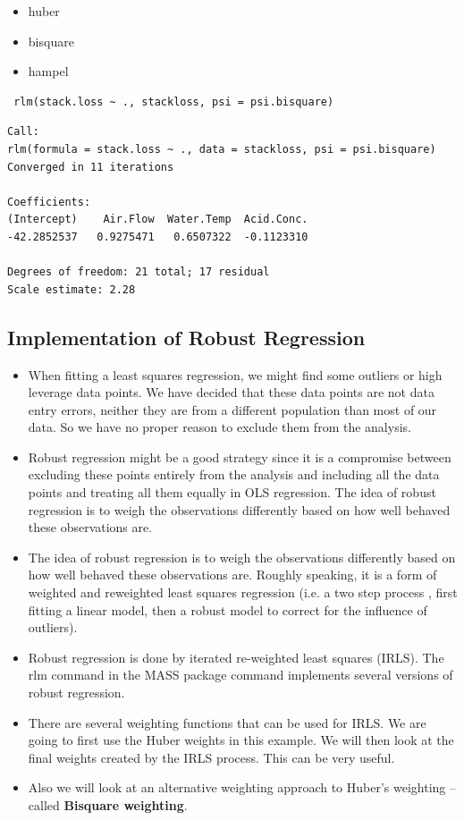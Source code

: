 \documentclass[12pt, a4paper]{article}
\theoremstyle{plain}
\theoremstyle{definition}
\theoremstyle{remark}
\begin{document}
\begin{itemize}
\item huber
\item bisquare
\item hampel

\end{itemize}

\begin{framed}
\begin{verbatim}
 rlm(stack.loss ~ ., stackloss, psi = psi.bisquare)
\end{verbatim}
\end{framed}
\begin{verbatim}
Call:
rlm(formula = stack.loss ~ ., data = stackloss, psi = psi.bisquare)
Converged in 11 iterations

Coefficients:
(Intercept)    Air.Flow  Water.Temp  Acid.Conc. 
-42.2852537   0.9275471   0.6507322  -0.1123310 

Degrees of freedom: 21 total; 17 residual
Scale estimate: 2.28 
\end{verbatim}


\subsection{Implementation of Robust Regression}
\begin{itemize}
\item When fitting a least squares regression, we might find some outliers or high leverage data points.  We have decided that these data points are not data entry errors, neither they are from a different population than most of our data. So we have no proper reason to exclude them from the analysis.  

\item Robust regression might be a good strategy since it is a compromise between excluding these points entirely from the analysis and including all the data points and treating all them equally in OLS regression. The idea of robust regression is to weigh the observations differently based on how well behaved these observations are.

\item 
The idea of robust regression is to weigh the observations differently based on how well behaved these observations are. Roughly speaking, it is a form of weighted and reweighted least squares regression (i.e. a two step process , first fitting a linear model, then a robust model to correct for the influence of outliers).
\item 
Robust regression is done by iterated re-weighted least squares (IRLS). The rlm command in the MASS package command implements several versions of robust regression.
\item 
There are several weighting functions that can be used for IRLS. We are going to first use the Huber weights in this example. We will then look at the final weights created by the IRLS process. This can be very useful. 
\item 
Also we will look at an alternative weighting approach to Huber’s weighting – called \textbf{Bisquare weighting}. 
\end{itemize}
\end{document}
